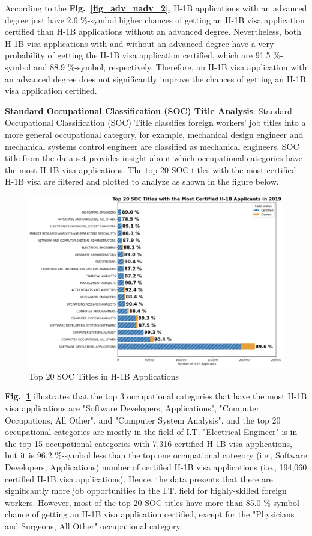 \documentclass[conference]{IEEEtran}
\begin{document}
According to the \textbf{Fig.~\ref{fig_adv_nadv_2}}, H-1B applications with an advanced degree just have 2.6 \%-symbol higher chances of getting an H-1B visa application certified than H-1B applications without an advanced degree. Nevertheless, both H-1B visa applications with and without an advanced degree have a very probability of getting the H-1B visa application certified, which are 91.5 \%-symbol and 88.9 \%-symbol, respectively. Therefore, an H-1B visa application with an advanced degree does not significantly improve the chances of getting an H-1B visa application certified.

\textbf{Standard Occupational Classification (SOC) Title Analysis}: Standard Occupational Classification (SOC) Title classifies foreign workers' job titles into a more general occupational category, for example, mechanical design engineer and mechanical systems control engineer are classified as mechanical engineers. SOC title from the data-set provides insight about which occupational categories have the most H-1B visa applications. The top 20 SOC titles with the most certified H-1B visa are filtered and plotted to analyze as shown in the figure below.

\begin{figure}[htbp]
\centerline{\hbox{\hspace{1em}\includegraphics[scale = 0.3]{SOC_Title.png}}}
\caption{Top 20 SOC Titles in H-1B Applications}
\label{fig_soc}
\end{figure}

\textbf{Fig.~\ref{fig_soc}} illustrates that the top 3 occupational categories that have the most H-1B visa applications are "Software Developers, Applications", "Computer Occupations, All Other", and "Computer System Analysis", and the top 20 occupational categories are mostly in the field of I.T. "Electrical Engineer" is in the top 15 occupational categories with 7,316 certified H-1B visa applications, but it is 96.2 \%-symbol less than the top one occupational category (i.e., Software Developers, Applications) number of certified H-1B visa applications (i.e., 194,060 certified H-1B visa applications). Hence, the data presents that there are significantly more job opportunities in the I.T. field for highly-skilled foreign workers. However, most of the top 20 SOC titles have more than 85.0 \%-symbol chance of getting an H-1B visa application certified, except for the "Physicians and Surgeons, All Other" occupational category.
\end{document}

